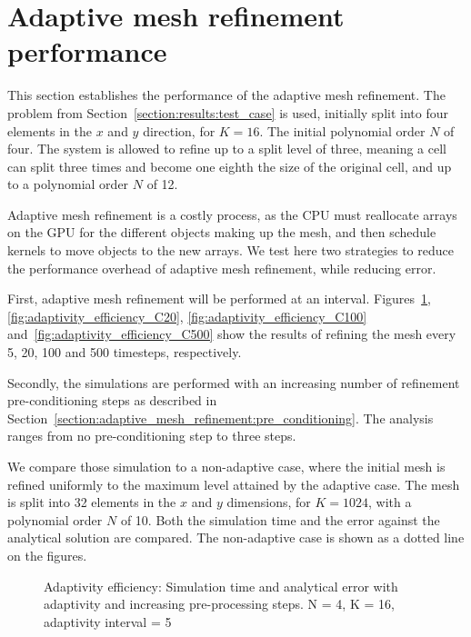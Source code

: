 \section{Adaptive mesh refinement performance} \label{section:results:adaptivity_performance}

This section establishes the performance of the adaptive mesh refinement. The problem from
Section~\ref{section:results:test_case} is used, initially split into four elements in the $x$ and
$y$ direction, for $K = 16$. The initial polynomial order $N$ of four. The system is allowed to
refine up to a split level of three, meaning a cell can split three times and become one eighth the
size of the original cell, and up to a polynomial order $N$ of 12.

Adaptive mesh refinement is a costly process, as the CPU must reallocate arrays on the GPU for the
different objects making up the mesh, and then schedule kernels to move objects to the new arrays.
We test here two strategies to reduce the performance overhead of adaptive mesh refinement, while
reducing error. 

First, adaptive mesh refinement will be performed at an interval.
Figures~\ref{fig:adaptivity_efficiency_C5}, \ref{fig:adaptivity_efficiency_C20},
\ref{fig:adaptivity_efficiency_C100} and~\ref{fig:adaptivity_efficiency_C500} show the results of
refining the mesh every 5, 20, 100 and 500 timesteps, respectively.

Secondly, the simulations are performed with an increasing number of refinement pre-conditioning
steps as described in Section~\ref{section:adaptive_mesh_refinement:pre_conditioning}. The analysis
ranges from no pre-conditioning step to three steps.

We compare those simulation to a non-adaptive case, where the initial mesh is refined uniformly to
the maximum level attained by the adaptive case. The mesh is split into 32 elements in the $x$ and
$y$ dimensions, for $K = 1024$, with a polynomial order $N$ of 10. Both the simulation time and the
error against the analytical solution are compared. The non-adaptive case is shown as a dotted line
on the figures.

\begin{figure}[H]
	\centering
	
	\caption{Adaptivity efficiency: Simulation time and analytical error with adaptivity and increasing pre-processing steps. N = 4, K = 16, adaptivity interval = 5}
	\label{fig:adaptivity_efficiency_C5}
\end{figure}

